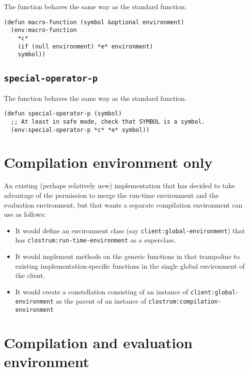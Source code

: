 The \sysname{} function behaves the same way as the standard function.

\begin{verbatim}
(defun macro-function (symbol &optional environment)
  (env:macro-function 
    *c* 
    (if (null environment) *e* environment)
    symbol))
\end{verbatim}

\subsection{\texttt{special-operator-p}}

The \sysname{} function behaves the same way as the standard function.

\begin{verbatim}
(defun special-operator-p (symbol)
  ;; At least in safe mode, check that SYMBOL is a symbol.
  (env:special-operator-p *c* *e* symbol))   
\end{verbatim}

\section{Compilation environment only}

An existing (perhaps relatively new) \commonlisp{} implementation that
has decided to take advantage of the permission to merge the run-time
environment and the evaluation environment, but that wants a separate
compilation environment can use \sysname{} as follows:

\begin{itemize}
\item It would define an environment class  (say
  \texttt{client:global-environment}) that has
  \texttt{clostrum:run-time-environment} as a superclass.
\item It would implement methods on the generic functions in
   that trampoline to existing
  implementation-specific functions in the single global environment
  of the client.
\item It would create a constellation consisting of an instance of
  \texttt{client:global-environment} as the parent of an instance of
  \texttt{clostrum:compilation-environment}
\end{itemize}

\section{Compilation and evaluation environment}

